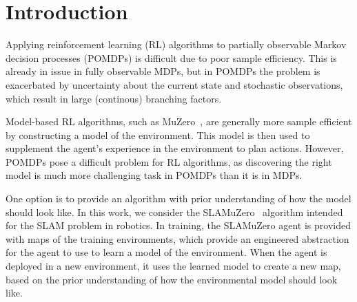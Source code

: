 \documentclass[12pt]{article}
\begin{document}
\section{Introduction}





Applying reinforcement learning (RL) algorithms to partially observable Markov decision processes (POMDPs) is difficult due to poor sample efficiency. This is already in issue in fully observable MDPs, but in POMDPs the problem is exacerbated by uncertainty about the current state and stochastic observations, which result in large (continous) branching factors. 

Model-based RL algorithms, such as MuZero~\cite{schrittwieserMasteringAtariGo2020}, are generally more sample efficient by constructing a model of the environment. This model is then used to supplement the agent's experience in the environment to plan actions. However, POMDPs pose a difficult problem for RL algorithms, as discovering the right model is much more challenging task in POMDPs than it is in MDPs.

One option is to provide an algorithm with prior understanding of how the model should look like.
In this work, we consider the SLAMuZero~\cite{fangSLAMuZeroPlanLearn2024} algorithm intended for the SLAM problem in robotics. 
In training, the SLAMuZero agent is provided with maps of the training environments, which provide an engineered abstraction for the agent to use to learn a model of the environment.
When the agent is deployed in a new environment, it uses the learned model to create a new map, based on the prior understanding of how the environmental model should look like.
\end{document}
